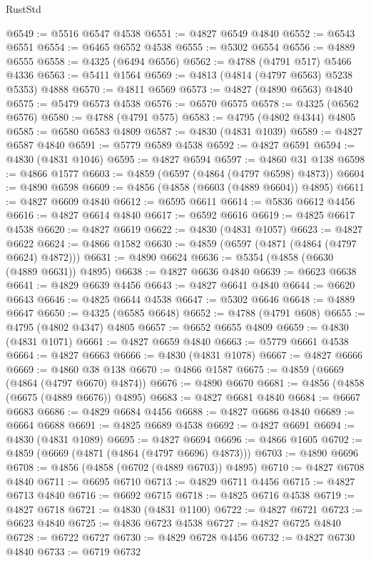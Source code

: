 \begin{lexlean}{RustStd}
\begin{coremodule}
@6549 := @5516 @6547 @4538
@6551 := @4827 @6549 @4840
@6552 := @6543 @6551
@6554 := @6465 @6552 @4538
@6555 := @5302 @6554
@6556 := @4889 @6555
@6558 := @4325 (@6494 @6556)
@6562 := @4788 (@4791 @517) @5466 @4336
@6563 := @5411 @1564
@6569 := @4813 (@4814 (@4797 @6563) @5238 @5353) @4888
@6570 := @4811 @6569
@6573 := @4827 (@4890 @6563) @4840
@6575 := @5479 @6573 @4538
@6576 := @6570 @6575
@6578 := @4325 (@6562 @6576)
@6580 := @4788 (@4791 @575)
@6583 := @4795 (@4802 @4344) @4805
@6585 := @6580 @6583 @4809
@6587 := @4830 (@4831 @1039)
@6589 := @4827 @6587 @4840
@6591 := @5779 @6589 @4538
@6592 := @4827 @6591
@6594 := @4830 (@4831 @1046)
@6595 := @4827 @6594
@6597 := @4860 @31 @138
@6598 := @4866 @1577
@6603 := @4859 (@6597 (@4864 (@4797 @6598) @4873))
@6604 := @4890 @6598
@6609 := @4856 (@4858 (@6603 (@4889 @6604)) @4895)
@6611 := @4827 @6609 @4840
@6612 := @6595 @6611
@6614 := @5836 @6612 @4456
@6616 := @4827 @6614 @4840
@6617 := @6592 @6616
@6619 := @4825 @6617 @4538
@6620 := @4827 @6619
@6622 := @4830 (@4831 @1057)
@6623 := @4827 @6622
@6624 := @4866 @1582
@6630 := @4859 (@6597 (@4871 (@4864 (@4797 @6624) @4872)))
@6631 := @4890 @6624
@6636 := @5354 (@4858 (@6630 (@4889 @6631)) @4895)
@6638 := @4827 @6636 @4840
@6639 := @6623 @6638
@6641 := @4829 @6639 @4456
@6643 := @4827 @6641 @4840
@6644 := @6620 @6643
@6646 := @4825 @6644 @4538
@6647 := @5302 @6646
@6648 := @4889 @6647
@6650 := @4325 (@6585 @6648)
@6652 := @4788 (@4791 @608)
@6655 := @4795 (@4802 @4347) @4805
@6657 := @6652 @6655 @4809
@6659 := @4830 (@4831 @1071)
@6661 := @4827 @6659 @4840
@6663 := @5779 @6661 @4538
@6664 := @4827 @6663
@6666 := @4830 (@4831 @1078)
@6667 := @4827 @6666
@6669 := @4860 @38 @138
@6670 := @4866 @1587
@6675 := @4859 (@6669 (@4864 (@4797 @6670) @4874))
@6676 := @4890 @6670
@6681 := @4856 (@4858 (@6675 (@4889 @6676)) @4895)
@6683 := @4827 @6681 @4840
@6684 := @6667 @6683
@6686 := @4829 @6684 @4456
@6688 := @4827 @6686 @4840
@6689 := @6664 @6688
@6691 := @4825 @6689 @4538
@6692 := @4827 @6691
@6694 := @4830 (@4831 @1089)
@6695 := @4827 @6694
@6696 := @4866 @1605
@6702 := @4859 (@6669 (@4871 (@4864 (@4797 @6696) @4873)))
@6703 := @4890 @6696
@6708 := @4856 (@4858 (@6702 (@4889 @6703)) @4895)
@6710 := @4827 @6708 @4840
@6711 := @6695 @6710
@6713 := @4829 @6711 @4456
@6715 := @4827 @6713 @4840
@6716 := @6692 @6715
@6718 := @4825 @6716 @4538
@6719 := @4827 @6718
@6721 := @4830 (@4831 @1100)
@6722 := @4827 @6721
@6723 := @6623 @4840
@6725 := @4836 @6723 @4538
@6727 := @4827 @6725 @4840
@6728 := @6722 @6727
@6730 := @4829 @6728 @4456
@6732 := @4827 @6730 @4840
@6733 := @6719 @6732

\end{coremodule}
\end{lexlean}
